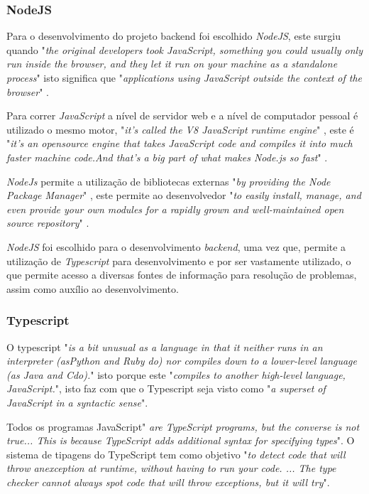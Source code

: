 \subsubsection{NodeJS}

Para o desenvolvimento do projeto backend foi escolhido \textit{NodeJS}, este surgiu quando "\emph{the original developers took JavaScript, something you could usually only run inside the browser, and they let it run on your machine as a standalone process}"\citep{design_node} isto significa que "\emph{applications using JavaScript outside the context of the browser}"\citep{design_node} .

Para correr \textit{JavaScript} a nível de servidor web e a nível de computador pessoal é utilizado o mesmo motor, "\emph{it's called the V8 JavaScript runtime engine}"\citep{design_node} , este é "\emph{it's an opensource engine that takes JavaScript code and compiles it into much faster machine code.And that's a big part of what makes Node.js so fast}"\citep{design_node} .

\textit{NodeJs} permite a utilização de bibliotecas externas "\emph{by providing the Node Package Manager}"\citep{design_node} , este permite ao desenvolvedor "\emph{to easily install, manage, and even provide  your own modules for a rapidly grown and well-maintained open source repository}"\citep{design_node} .

\textit{NodeJS} foi escolhido para o desenvolvimento \textit{backend}, uma vez que, permite a utilização de \textit{Typescript} para desenvolvimento e por ser vastamente utilizado, o que permite acesso a diversas fontes de informação para resolução de problemas, assim como auxílio ao desenvolvimento.

\newpage

\subsubsection{Typescript}
O typescript "\emph{is  a  bit  unusual  as  a  language  in  that  it  neither  runs  in  an  interpreter  (asPython  and  Ruby  do)  nor  compiles  down  to  a  lower-level  language  (as  Java  and  Cdo).}"\citep{typescript} isto porque este "\emph{compiles  to  another  high-level  language,  JavaScript.}"\citep{typescript}, isto faz com que o Typescript seja visto como "\emph{a  superset  of  JavaScript  in  a  syntactic  sense}"\citep{typescript}.

Todos os programas JavaScript" \emph{are  TypeScript  programs,  but  the  converse  is  not  true... This  is  because  TypeScript adds additional syntax for specifying types}". O sistema de tipagens do TypeScript tem como objetivo "\emph{to  detect  code  that  will  throw  anexception  at  runtime,  without  having  to  run  your  code. ... The  type  checker  cannot always spot code that will throw exceptions, but it will try}"\citep{typescript}.

